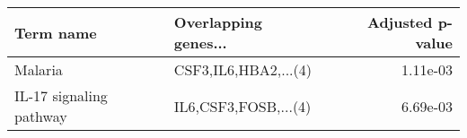\begin{tabular}{llr}
\toprule
              Term name & Overlapping genes... &  Adjusted p-value \\
\midrule
                Malaria & CSF3,IL6,HBA2,...(4) &          1.11e-03 \\
IL-17 signaling pathway & IL6,CSF3,FOSB,...(4) &          6.69e-03 \\
\bottomrule
\end{tabular}
